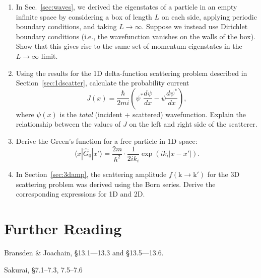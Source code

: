 \documentclass[pra,12pt]{revtex4-2}
\begin{document}
\begin{enumerate}
\item In Sec.~\ref{sec:waves}, we derived the eigenstates of a
  particle in an empty infinite space by considering a box of length
  $L$ on each side, applying periodic boundary conditions, and taking
  $L \rightarrow \infty$.  Suppose we instead use Dirichlet boundary
  conditions (i.e., the wavefunction vanishes on the walls of the
  box).  Show that this gives rise to the same set of momentum
  eigenstates in the $L \rightarrow \infty$ limit.

\item Using the results for the 1D delta-function scattering problem
  described in Section~\ref{sec:1dscatter}, calculate the probability
  current
  \begin{equation}
    J(x) = \frac{\hbar}{2mi}\left(\psi^*\frac{d\psi}{dx} - \psi\frac{d\psi^*}{dx}\right),
  \end{equation}
  where $\psi(x)$ is the \textit{total} (incident + scattered)
  wavefunction.  Explain the relationship between the values of $J$ on
  the left and right side of the scatterer.

\item Derive the Green's function for a free particle in 1D space:
  \begin{equation}
    \langle x|\hat{G}_0|x'\rangle = \frac{2m}{\hbar^2} \cdot \frac{1}{2ik_i} \exp\left(ik_i|x-x'|\right).
  \end{equation}

\item In Section~\ref{sec:3damp}, the scattering amplitude
  $f(\mathrm{k}\rightarrow\mathrm{k}')$ for the 3D scattering problem
  was derived using the Born series.  Derive the corresponding
  expressions for 1D and 2D.
\end{enumerate}

\section*{Further Reading}

\begin{enumerate}[[1{]}]
\item Bransden \& Joachain, \S13.1---13.3 and \S13.5---13.6.
\item Sakurai, \S7.1--7.3, 7.5--7.6
\end{enumerate}
\end{document}
